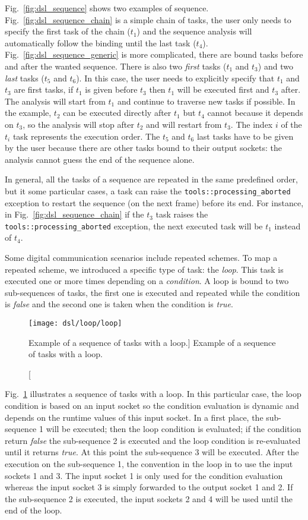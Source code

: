 Fig.~\ref{fig:dsl_sequence} shows two examples of sequence.
Fig.~\ref{fig:dsl_sequence_chain} is a simple chain of tasks, the user only
needs to specify the first task of the chain ($t_1$) and the sequence analysis
will automatically follow the binding until the last task ($t_4$).
Fig.~\ref{fig:dsl_sequence_generic} is more complicated, there are bound tasks
before and after the wanted sequence. There is also two \emph{first} tasks
($t_1$ and $t_3$) and two \emph{last} tasks ($t_5$ and $t_6$). In this case, the
user needs to explicitly specify that $t_1$ and $t_3$ are first tasks, if $t_1$
is given before $t_3$ then $t_1$ will be executed first and $t_3$ after. The
analysis will start from $t_1$ and continue to traverse new tasks if possible.
In the example, $t_2$ can be executed directly after $t_1$ but $t_4$ cannot
because it depends on $t_3$, so the analysis will stop after $t_2$ and will
restart from $t_3$. The index $i$ of the $t_i$ task represents the execution
order. The $t_5$ and $t_6$ last tasks have to be given by the user because there
are other tasks bound to their output sockets: the analysis cannot guess the end
of the sequence alone.

In general, all the tasks of a sequence are repeated in the same predefined
order, but it some particular cases, a task can raise the
\verb|tools::processing_aborted| exception to restart the sequence (on the next
frame) before its end. For instance, in Fig.~\ref{fig:dsl_sequence_chain} if the
$t_3$ task raises the \verb|tools::processing_aborted| exception, the next
executed task will be $t_1$ instead of $t_4$.

Some digital communication scenarios include repeated schemes. To map a repeated
scheme, we introduced a specific type of task: the \emph{loop}. This task is
executed one or more times depending on a \emph{condition}. A loop is bound to
two sub-sequences of tasks, the first one is executed and repeated while the
condition is \emph{false} and the second one is taken when the condition is
\emph{true}.

\begin{figure}[htp]
  \centering
  \texttt{[image: dsl/loop/loop]}
  \caption
    [Example of a sequence of tasks with a loop.]
    {Example of a sequence of tasks with a loop.}
  \label{fig:dsl_loop}
\end{figure}

Fig.~\ref{fig:dsl_loop} illustrates a sequence of tasks with a loop. In this
particular case, the loop condition is based on an input socket so the condition
evaluation is dynamic and depends on the runtime values of this input socket.
In a first place, the sub-sequence 1 will be executed; then the loop condition
is evaluated; if the condition return \emph{false} the sub-sequence 2 is
executed and the loop condition is re-evaluated until it returns \emph{true}. At
this point the sub-sequence 3 will be executed. After the execution on the
sub-sequence 1, the convention in the loop in to use the input sockets 1 and 3.
The input socket 1 is only used for the condition evaluation whereas the input
socket 3 is simply forwarded to the output socket 1 and 2. If the sub-sequence 2
is executed, the input sockets 2 and 4 will be used until the end of the loop.

